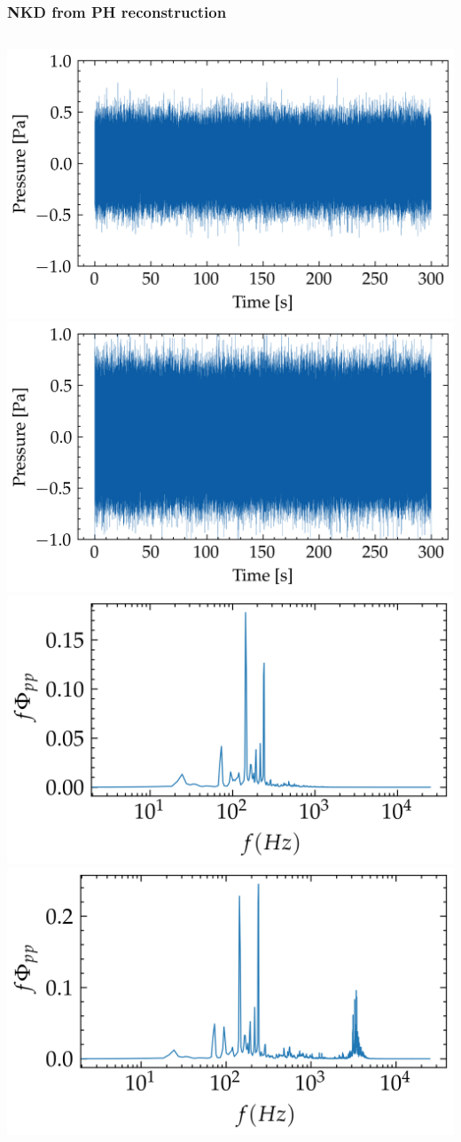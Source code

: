 \documentclass[aspectratio=169,10pt]{beamer}
\begin{document}
\begin{frame}
    \frametitle{NKD from PH reconstruction}
    \begin{columns}[c] %
            \centering
            \includegraphics[width=0.6\linewidth]{../figures/cali_09/flow/raw/ph_atm.png}
            \includegraphics[width=0.6\linewidth]{../figures/cali_09/flow/raw/nkd_recon_from_ph_atm.png}
            \centering
            \includegraphics[width=0.6\linewidth]{../figures/cali_09/flow/raw/Pyy_ph_raw_atm.png}
            \includegraphics[width=0.6\linewidth]{../figures/cali_09/flow/raw/Pyy_nkd_from_ph_atm.png}
    \end{columns}
\end{frame}
\end{document}
